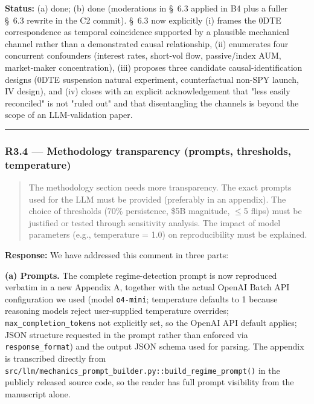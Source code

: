 \documentclass[11pt,a4paper]{article}
\begin{document}
\textbf{Status:} (a) done; (b) done (moderations in \S{}~6.3 applied in B4 plus a
fuller \S{}~6.3 rewrite in the C2 commit). \S{}~6.3 now explicitly (i) frames
the 0DTE correspondence as temporal coincidence supported by a
plausible mechanical channel rather than a demonstrated causal
relationship, (ii) enumerates four concurrent confounders (interest
rates, short-vol flow, passive/index AUM, market-maker concentration),
(iii) proposes three candidate causal-identification designs (0DTE
suspension natural experiment, counterfactual non-SPY launch, IV
design), and (iv) closes with an explicit acknowledgement that
"less easily reconciled" is not "ruled out" and that disentangling the
channels is beyond the scope of an LLM-validation paper.

\bigskip\hrule\bigskip

\subsubsection*{R3.4 --- Methodology transparency (prompts, thresholds, temperature)}

\begin{quote}
The methodology section needs more transparency. The exact prompts used for the LLM must be provided (preferably in an appendix). The choice of thresholds (70\% persistence, \$5B magnitude, $\leq$5 flips) must be justified or tested through sensitivity analysis. The impact of model parameters (e.g., temperature = 1.0) on reproducibility must be explained.
\end{quote}

\textbf{Response:} We have addressed this comment in three parts:

\textbf{(a) Prompts.} The complete regime-detection prompt is now reproduced
verbatim in a new Appendix A, together with the actual OpenAI Batch API
configuration we used (model \texttt{o4-mini}; temperature defaults to 1
because reasoning models reject user-supplied temperature overrides;
\texttt{max\_completion\_tokens} not explicitly set, so the OpenAI API default
applies; JSON structure requested in the prompt rather than enforced
via \texttt{response\_format}) and the output JSON schema used for parsing.
The appendix is transcribed directly from
\texttt{src/llm/mechanics\_prompt\_builder.py::build\_regime\_prompt()} in the
publicly released source code, so the reader has full prompt visibility
from the manuscript alone.
\end{document}
